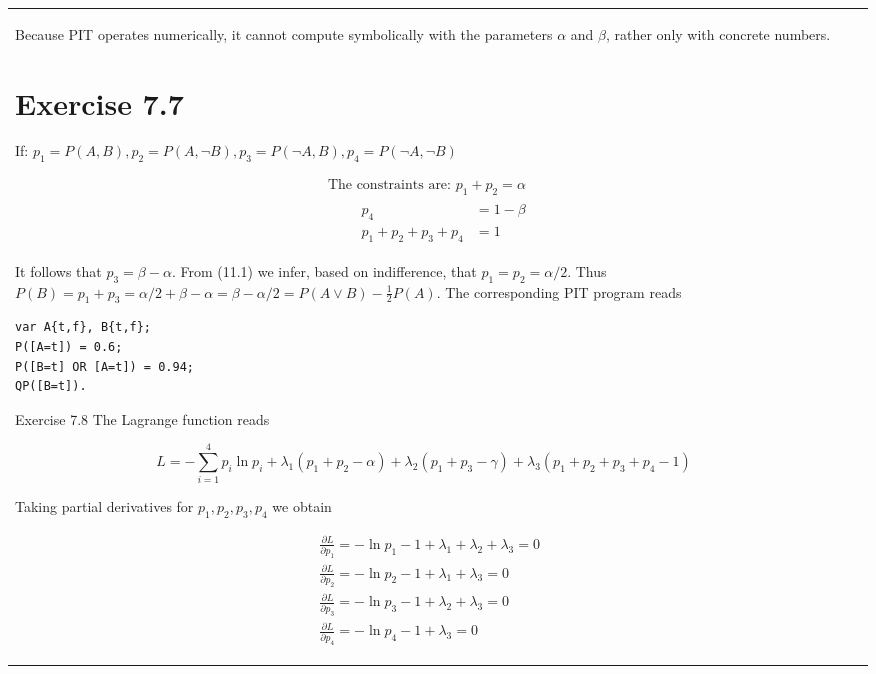 \documentclass[10pt]{book}
\begin{document}
\begin{center}
\begin{tabular}{|l|l|l|}
Because PIT operates numerically, it cannot compute symbolically with the parameters $\alpha$ and $\beta$, rather only with concrete numbers.

\section{Exercise 7.7}
If: $p_{1}=P(A, B), p_{2}=P(A, \neg B), p_{3}=P(\neg A, B), p_{4}=P(\neg A, \neg B)$

\begin{align*}
& \text{The constraints are: } p_{1}+p_{2}=\alpha \tag{11.1}\\
& \qquad \begin{aligned}
p_{4} & =1-\beta \\
p_{1}+p_{2}+p_{3}+p_{4} & =1
\end{aligned} \tag{11.2}
\end{align*}

It follows that $p_{3}=\beta-\alpha$. From (11.1) we infer, based on indifference, that $p_{1}=p_{2}=\alpha / 2$. Thus $P(B)=p_{1}+p_{3}=\alpha / 2+\beta-\alpha=\beta-\alpha / 2=P(A \vee B)-\tfrac{1}{2}P(A)$. The corresponding PIT program reads

\begin{verbatim}
var A{t,f}, B{t,f};
P([A=t]) = 0.6;
P([B=t] OR [A=t]) = 0.94;
QP([B=t]).
\end{verbatim}

Exercise 7.8 The Lagrange function reads

\begin{equation*}
L=-\sum_{i=1}^{4} p_{i} \ln p_{i}+\lambda_{1}\left(p_{1}+p_{2}-\alpha\right)+\lambda_{2}\left(p_{1}+p_{3}-\gamma\right)+\lambda_{3}\left(p_{1}+p_{2}+p_{3}+p_{4}-1\right) \tag{11.4}
\end{equation*}

Taking partial derivatives for $p_{1}, p_{2}, p_{3}, p_{4}$ we obtain

\begin{align*}
& \frac{\partial L}{\partial p_{1}}=-\ln p_{1}-1+\lambda_{1}+\lambda_{2}+\lambda_{3}=0 \tag{11.5}\\
& \frac{\partial L}{\partial p_{2}}=-\ln p_{2}-1+\lambda_{1}+\lambda_{3}=0 \tag{11.6}\\
& \frac{\partial L}{\partial p_{3}}=-\ln p_{3}-1+\lambda_{2}+\lambda_{3}=0 \tag{11.7}\\
& \frac{\partial L}{\partial p_{4}}=-\ln p_{4}-1+\lambda_{3}=0 \tag{11.8}
\end{align*}


\end{tabular}
\end{center}
\end{document}
